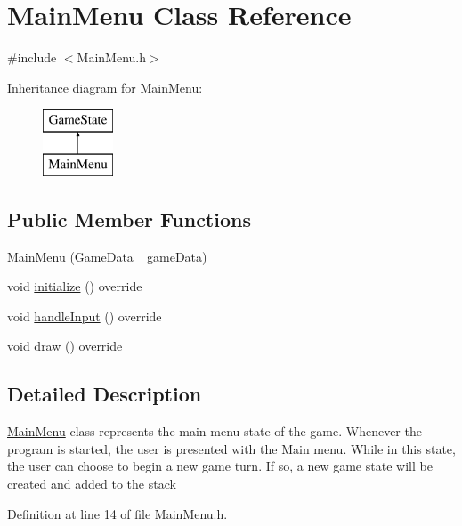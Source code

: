 \hypertarget{class_main_menu}{}\section{Main\+Menu Class Reference}
\label{class_main_menu}


{\ttfamily \#include $<$Main\+Menu.\+h$>$}

Inheritance diagram for Main\+Menu\+:\begin{figure}[H]
\begin{center}
\leavevmode
\includegraphics[height=2.000000cm]{class_main_menu}
\end{center}
\end{figure}
\subsection*{Public Member Functions}
\begin{DoxyCompactItemize}
\item 
\mbox{\hyperlink{class_main_menu_a8d497d8355d40b03a6347190b13b2984}{Main\+Menu}} (\mbox{\hyperlink{_engine_8h_a5bbe002e9f7f45a67e8fda9dbe980a3f}{Game\+Data}} \+\_\+game\+Data)
\item 
void \mbox{\hyperlink{class_main_menu_a039698cefc631351e79f097c41e39d1c}{initialize}} () override
\item 
void \mbox{\hyperlink{class_main_menu_aa73613e97c322cba65028f3693b8c665}{handle\+Input}} () override
\item 
void \mbox{\hyperlink{class_main_menu_a54ec1eed16b49cac99d640feab93e119}{draw}} () override
\end{DoxyCompactItemize}


\subsection{Detailed Description}
\mbox{\hyperlink{class_main_menu}{Main\+Menu}} class represents the main menu state of the game. Whenever the program is started, the user is presented with the Main menu. While in this state, the user can choose to begin a new game turn. If so, a new game state will be created and added to the stack 

Definition at line 14 of file Main\+Menu.\+h.



